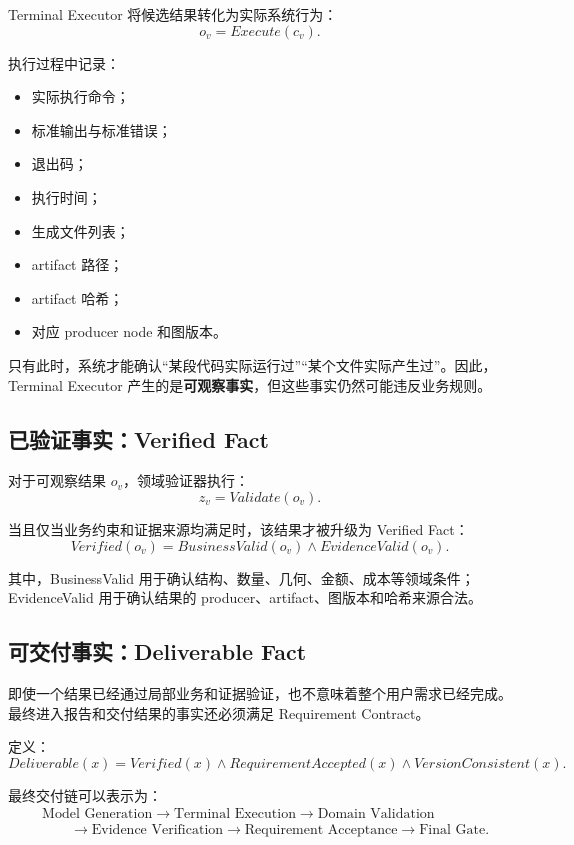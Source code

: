 \documentclass[UTF8,a4paper,12pt,oneside]{ctexbook}
\begin{document}
Terminal Executor 将候选结果转化为实际系统行为：
\[
o_v = Execute(c_v).
\]

执行过程中记录：

\begin{itemize}
    \item 实际执行命令；
    \item 标准输出与标准错误；
    \item 退出码；
    \item 执行时间；
    \item 生成文件列表；
    \item artifact 路径；
    \item artifact 哈希；
    \item 对应 producer node 和图版本。
\end{itemize}

只有此时，系统才能确认“某段代码实际运行过”“某个文件实际产生过”。因此，Terminal Executor 产生的是\textbf{可观察事实}，但这些事实仍然可能违反业务规则。


\subsection{已验证事实：Verified Fact}

对于可观察结果 $o_v$，领域验证器执行：
\[
z_v = Validate(o_v).
\]

当且仅当业务约束和证据来源均满足时，该结果才被升级为 Verified Fact：
\[
Verified(o_v)
=
BusinessValid(o_v)
\land
EvidenceValid(o_v).
\]

其中，BusinessValid 用于确认结构、数量、几何、金额、成本等领域条件；EvidenceValid 用于确认结果的 producer、artifact、图版本和哈希来源合法。


\subsection{可交付事实：Deliverable Fact}

即使一个结果已经通过局部业务和证据验证，也不意味着整个用户需求已经完成。最终进入报告和交付结果的事实还必须满足 Requirement Contract。

定义：
\[
Deliverable(x)
=
Verified(x)
\land
RequirementAccepted(x)
\land
VersionConsistent(x).
\]

最终交付链可以表示为：
\[
\begin{aligned}
&\text{Model Generation}
\rightarrow \text{Terminal Execution}
\rightarrow \text{Domain Validation} \\[3pt]
&\qquad\rightarrow \text{Evidence Verification}
\rightarrow \text{Requirement Acceptance}
\rightarrow \text{Final Gate}.
\end{aligned}
\]
\end{document}
